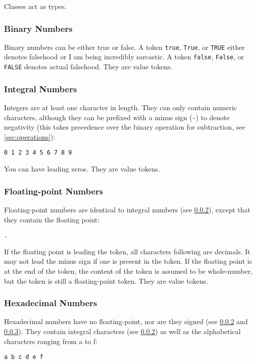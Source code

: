 \documentclass[10pt,a4paper]{article}
\begin{document}
Classes act as types.

\subsubsection{Binary Numbers}
\label{sec:booleans}
Binary numbers can be either true or false. A token \verb|true|, \verb|True|, or \verb|TRUE|  either denotes falsehood or I am being incredibly sarcastic. A token \verb|false|, \verb|False|, or \verb|FALSE| denotes actual falsehood. They are value tokens. 

\subsubsection{Integral Numbers}
\label{sec:integers}
Integers are at least one character in length. They can only contain numeric characters, although they can be prefixed with a minus sign (\verb|-|) to denote negativity (this takes precedence over the binary operation for subtraction, see \ref{sec:operations}):
\begin{verbatim}
0 1 2 3 4 5 6 7 8 9
\end{verbatim}

You can have leading zeros. They are value tokens. 

\subsubsection{Floating-point Numbers}
\label{sec:floats}
Floating-point numbers are identical to integral numbers (see \ref{sec:integers}), except that they contain the floating point:
\begin{verbatim}
.
\end{verbatim}

If the floating point is leading the token, all characters following are decimals. It may not lead the minus sign if one is present in the token. If the floating point is at the end of the token, the content of the token is assumed to be whole-number, but the token is still a floating-point token. They are value tokens.

\subsubsection{Hexadecimal Numbers}
Hexadecimal numbers have no floating-point, nor are they signed (see \ref{sec:integers} and \ref{sec:floats}). They contain integral characters (see \ref{sec:integers}) as well as the alphabetical characters ranging from a to f:
\begin{verbatim}
a b c d e f
\end{verbatim}
\end{document}
